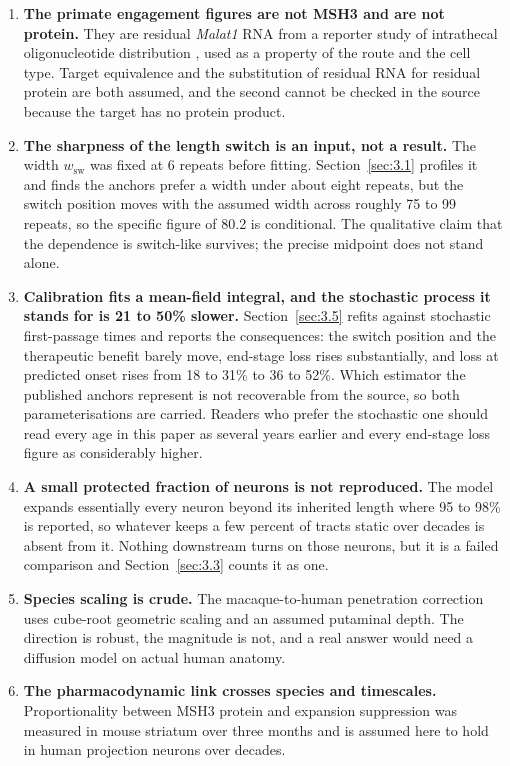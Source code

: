 \documentclass[conference]{IEEEtran}
\begin{document}
\begin{enumerate}
\item \textbf{The primate engagement figures are not MSH3 and are not protein.} They are residual \textit{Malat1} RNA from a reporter study of intrathecal oligonucleotide distribution \cite{frei}, used as a property of the route and the cell type. Target equivalence and the substitution of residual RNA for residual protein are both assumed, and the second cannot be checked in the source because the target has no protein product.
\item \textbf{The sharpness of the length switch is an input, not a result.} The width $w_{\mathrm{sw}}$ was fixed at 6 repeats before fitting. Section~\ref{sec:3.1} profiles it and finds the anchors prefer a width under about eight repeats, but the switch position moves with the assumed width across roughly 75 to 99 repeats, so the specific figure of 80.2 is conditional. The qualitative claim that the dependence is switch-like survives; the precise midpoint does not stand alone.
\item \textbf{Calibration fits a mean-field integral, and the stochastic process it stands for is 21 to 50\% slower.} Section~\ref{sec:3.5} refits against stochastic first-passage times and reports the consequences: the switch position and the therapeutic benefit barely move, end-stage loss rises substantially, and loss at predicted onset rises from 18 to 31\% to 36 to 52\%. Which estimator the published anchors represent is not recoverable from the source, so both parameterisations are carried. Readers who prefer the stochastic one should read every age in this paper as several years earlier and every end-stage loss figure as considerably higher.
\item \textbf{A small protected fraction of neurons is not reproduced.} The model expands essentially every neuron beyond its inherited length where 95 to 98\% is reported, so whatever keeps a few percent of tracts static over decades is absent from it. Nothing downstream turns on those neurons, but it is a failed comparison and Section~\ref{sec:3.3} counts it as one.
\item \textbf{Species scaling is crude.} The macaque-to-human penetration correction uses cube-root geometric scaling and an assumed putaminal depth. The direction is robust, the magnitude is not, and a real answer would need a diffusion model on actual human anatomy.
\item \textbf{The pharmacodynamic link crosses species and timescales.} Proportionality between MSH3 protein and expansion suppression was measured in mouse striatum over three months and is assumed here to hold in human projection neurons over decades.

\end{enumerate}
\end{document}

